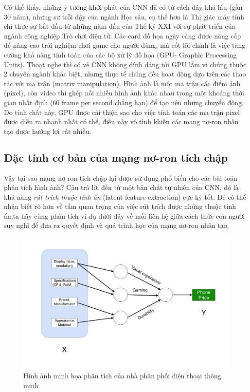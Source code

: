 Có thể thấy, những ý tưởng khởi phát của CNN đã có từ cách đây khá lâu (gần 30 năm), nhưng sự trỗi dậy của ngành Học sâu, cụ thể hơn là Thị giác máy tính chỉ thực sự bắt đầu từ những năm đầu của Thế kỷ XXI với sự phát triển của ngành công nghiệp Trò chơi điện tử. Các card đồ họa ngày càng được nâng cấp để nâng cao trải nghiệm chơi game cho người dùng, mà cốt lõi chính là việc tăng cường khả năng tính toán của các bộ xử lý đồ họa (GPU- Graphic Processing Units). Thoạt nghe thì có vẻ CNN không dính dáng tới GPU lắm vì chúng thuộc 2 chuyên ngành khác biệt, nhưng thực tế chúng đều hoạt động dựa trên các thao tác với ma trận (matrix manipulation). Hình ảnh là một ma trận các điểm ảnh (pixel), còn video thì ghép nối nhiều hình ảnh khác nhau trong một khoảng thời gian nhất định (60 frame per second chẳng hạn) để tạo nên những chuyển động. Do tính chất này, GPU được cải thiện sao cho việc tính toán các ma trận pixel được diễn ra nhanh nhất có thể, điều này vô tình khiến các mạng nơ-ron nhân tạo được hưởng lợi rất nhiều.

\subsection{Đặc tính cơ bản của mạng nơ-ron tích chập}

\hspace{\parindent} Vậy tại sao mạng nơ-ron tích chập lại được sử dụng phổ biến cho các bài toán phân tích hình ảnh? Câu trả lời đến từ một bản chất tự nhiên của CNN, đó là khả năng \textit{rút trích thuộc tính ẩn} (latent feature extraction) cực kỳ tốt. Để có thể nhận biết rõ hơn về tầm quan trọng của việc rút trích được những thuộc tính ẩn,ta hãy cùng phân tích ví dụ dưới đây về mối liên hệ giữa cách thức con người suy nghĩ để đưa ra quyết định và quá trình học của mạng nơ-ron nhân tạo.

\begin{figure}[!h]
	\centering
		\includegraphics[width=1.0\columnwidth]{books/artificial-neural-network/chapter05/figure/CNN_human_thinking.png}
		\centering
	\caption{Hình ảnh minh họa phân tích của nhà phân phối điện thoại thông minh}
	\label{fig:CNNHumanThinking}
\end{figure}

